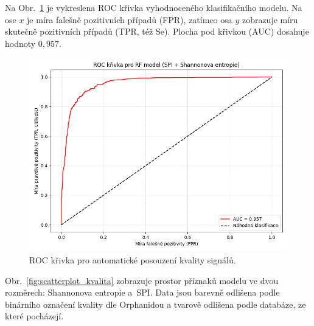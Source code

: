 Na Obr.~\ref{fig:roc_kvalita} je vykreslena \acs{ROC} křivka vyhodnoceného klasifikačního modelu.
Na ose $x$ je míra falešně pozitivních případů (\acs{FPR}), zatímco osa $y$ zobrazuje míru skutečně pozitivních případů (\acs{TPR}, též \acs{Se}).
Plocha pod křivkou (\acs{AUC}) dosahuje hodnoty $0,957$.

\begin{figure}[ht]
	\centering
	\includegraphics[width=1\textwidth]{./obrazky/vysledky/ROC.png}
	\caption[ROC křivka pro automatické posouzení kvality signálů]{ROC křivka pro automatické posouzení kvality signálů.}
	\label{fig:roc_kvalita}
\end{figure}

Obr.~\ref{fig:scatterplot_kvalita} zobrazuje prostor příznaků modelu ve dvou rozměrech: Shannonova entropie a~\acs{SPI}.
Data jsou barevně odlišena podle binárního označení kvality dle Orphanidou a tvarově odlišena podle databáze, ze které pocházejí.

